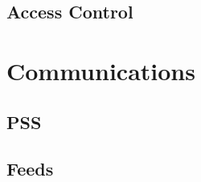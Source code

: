 \subsection{Access Control  \statusgreen}\label{spec:api:access-control}




\section{Communications  \statusorange}\label{spec:api:communications}


\subsection{PSS \statusyellow}\label{spec:api:trojan}



\subsection{Feeds \statusorange}\label{spec:api:feeds}




